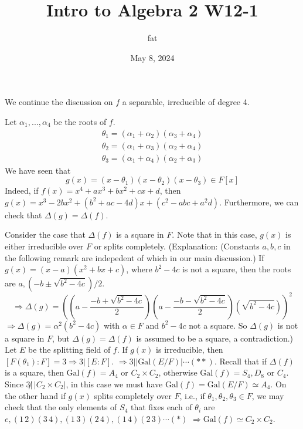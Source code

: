 \documentclass{article}
\title{Intro to Algebra 2 W12-1}
\author{fat}
\date{May 8, 2024}
\theoremstyle{definition}
\newcommand{\Ra}{\Rightarrow}
\newcommand{\Gal}{\text{Gal}}
\begin{document}
\maketitle
\thispagestyle{fancy}
\renewcommand{\footrulewidth}{0.4pt}
\cfoot{\thepage}
\renewcommand{\headrulewidth}{0.4pt}

We continue the discussion on $f$ a separable, irreducible of degree 4.

\par Let $\alpha_1, ..., \alpha_4$ be the roots of $f$.
\[
	\begin{split}
		\theta_1 = (\alpha_1 + \alpha_2) (\alpha_3 + \alpha_4)\\
		\theta_2 = (\alpha_1 + \alpha_3) (\alpha_2 + \alpha_4)\\
		\theta_3 = (\alpha_1 + \alpha_4) (\alpha_2 + \alpha_3)
	\end{split}
\]
We have seen that
\[
	g(x) = (x - \theta_1) (x - \theta_2) (x - \theta_3) \in F[x]
\]
Indeed, if $f(x) = x^4 + a x^3 + b x^2 + cx + d$, then $g(x) = x^3 - 2 bx^2 + (b^2 + ac - 4d) x + (c^2 - abc + a^2 d)$.
Furthermore, we can check that $\Delta(g) = \Delta(f)$.

\par Consider the case that $\Delta(f)$ is a square in $F$.
Note that in this case, $g(x)$ is either irreducible over $F$ or splits completely.
(Explanation: (Constants $a, b, c$ in the following remark are indepedent of which in our main discussion.)
If $g(x) = (x - a) (x^2 + bx + c)$, where $b^2 - 4c$ is not a square, then the roots are $a, (-b \pm \sqrt{b^2 - 4c})/2$.
\[
	\Ra \Delta(g) = \left( \left(a - \frac{-b + \sqrt{b^2 - 4c}}{2}\right) \left( a - \frac{-b - \sqrt{b^2 - 4c}}{2} \right) (\sqrt{b^2 - 4c})\right)^2
\]
$\Ra \Delta(g) = \alpha^2 (b^2 - 4c)$ with $\alpha \in F$ and $b^2 - 4c$ not a square.
So $\Delta(g)$ is not a square in $F$, but $\Delta(g) = \Delta(f)$ is assumed to be a square, a contradiction.)
Let $E$ be the splitting field of $f$.
If $g(x)$ is irreducible, then $[F(\theta_1):F] = 3 \Ra 3 | [E:F]$.
$\Ra 3 | |\Gal(E/F)| \cdots (**)$.
Recall that if $\Delta(f)$ is a square, then $\Gal(f) = A_4$ or $C_2 \times C_2$, otherwise $\Gal(f) = S_4, D_8$ or $C_4$.
Since $3 \not| \, |C_2 \times C_2|$, in this case we must have $\Gal(f) = \Gal(E/F) \simeq A_4$.
On the other hand if $g(x)$ splits completely over $F$, i.e., if $\theta_1, \theta_2, \theta_3 \in F$, we may check that the only elements of $S_4$ that fixes each of $\theta_i$ are $e, (1 \, 2) (3 \, 4), (1 \, 3) (2 \, 4), (1 \, 4) (2 \, 3) \cdots (*)$
$\Ra \Gal(f) \simeq C_2 \times C_2$.
\end{document}
